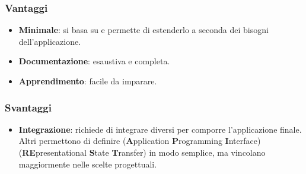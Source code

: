\subsubsection{Vantaggi}
\begin{itemize}
\item \textbf{Minimale}: si basa su  e permette di estenderlo a seconda dei bisogni dell'applicazione.
\item \textbf{Documentazione}: esaustiva e completa.
\item \textbf{Apprendimento}: facile da imparare.
\end{itemize}
\subsubsection{Svantaggi}
\begin{itemize}
\item \textbf{Integrazione}: richiede di integrare  diversi per comporre l'applicazione finale. Altri  permettono di definire  (\textbf{A}pplication \textbf{P}rogramming \textbf{I}nterface)  (\textbf{RE}presentational \textbf{S}tate \textbf{T}ransfer) in modo semplice, ma vincolano maggiormente nelle scelte progettuali.
\end{itemize}

